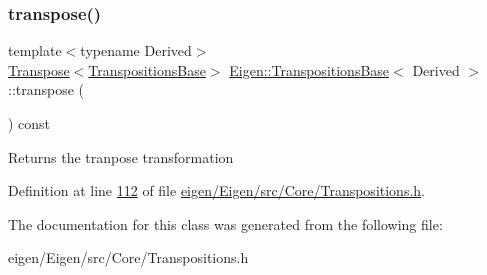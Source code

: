 \subsubsection{\texorpdfstring{transpose()}{transpose()}\hspace{0.1cm}{\footnotesize\ttfamily [2/2]}}
{\footnotesize\ttfamily template$<$typename Derived$>$ \\
\hyperlink{group___core___module_class_eigen_1_1_transpose}{Transpose}$<$\hyperlink{class_eigen_1_1_transpositions_base}{Transpositions\+Base}$>$ \hyperlink{class_eigen_1_1_transpositions_base}{Eigen\+::\+Transpositions\+Base}$<$ Derived $>$\+::transpose (\begin{DoxyParamCaption}{ }\end{DoxyParamCaption}) const\hspace{0.3cm}{\ttfamily [inline]}}

\begin{DoxyReturn}{Returns}
the tranpose transformation 
\end{DoxyReturn}


Definition at line \hyperlink{eigen_2_eigen_2src_2_core_2_transpositions_8h_source_l00112}{112} of file \hyperlink{eigen_2_eigen_2src_2_core_2_transpositions_8h_source}{eigen/\+Eigen/src/\+Core/\+Transpositions.\+h}.



The documentation for this class was generated from the following file\+:\begin{DoxyCompactItemize}
\item 
eigen/\+Eigen/src/\+Core/\+Transpositions.\+h\end{DoxyCompactItemize}
